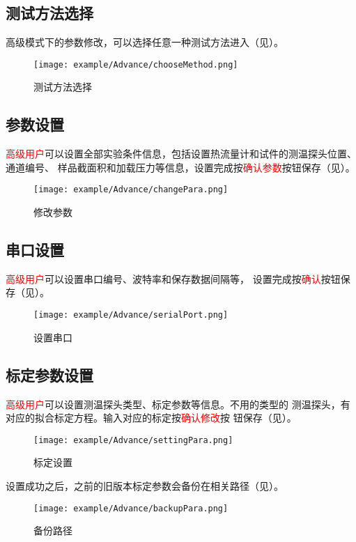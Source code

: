 \subsection{测试方法选择}
高级模式下的参数修改，可以选择任意一种测试方法进入（见）。
\begin{figure}[htbp]
	\centering
	\texttt{[image: example/Advance/chooseMethod.png]}
	\caption{ 测试方法选择\label{fig:advance_chooseMethod}}
\end{figure}

\subsection{参数设置}
\textcolor{red}{高级用户}可以设置全部实验条件信息，包括设置热流量计和试件的测温探头位置、通道编号、
样品截面积和加载压力等信息，设置完成按\textcolor{red}{确认参数}按钮保存（见）。
\begin{figure}[htbp]
	\centering
	\texttt{[image: example/Advance/changePara.png]}
	\caption{ 修改参数 \label{fig:advance_changePara}}
\end{figure}

\subsection{串口设置}
\textcolor{red}{高级用户}可以设置串口编号、波特率和保存数据间隔等，
设置完成按\textcolor{red}{确认}按钮保存（见）。
\begin{figure}[htbp]
	\centering
	\texttt{[image: example/Advance/serialPort.png]}
	\caption{ 设置串口 \label{fig:advance_serialPort}}
\end{figure}

\subsection{标定参数设置}
\textcolor{red}{高级用户}可以设置测温探头类型、标定参数等信息。不用的类型的
测温探头，有对应的拟合标定方程。输入对应的标定按\textcolor{red}{确认修改}按
钮保存（见）。
\begin{figure}[htbp]
	\centering
	\texttt{[image: example/Advance/settingPara.png]}
	\caption{ 标定设置 \label{fig:advance_settingPara}}
\end{figure}
设置成功之后，之前的旧版本标定参数会备份在相关路径（见）。
\begin{figure}[htbp]
	\centering
	\texttt{[image: example/Advance/backupPara.png]}
	\caption{ 备份路径 \label{fig:advance_backupPara}}
\end{figure}






